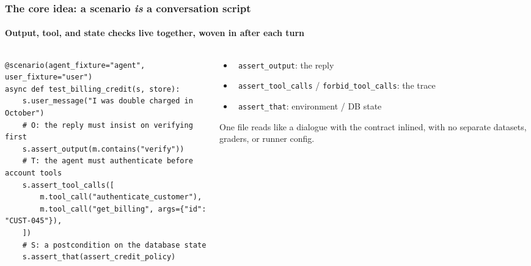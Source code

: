 \documentclass[
	aspectratio=169, %
	t,               %
	onlytextwidth,
	10pt,
]{beamer}
\newcommand{\chip}[2]{\tikz[baseline=(c.base)]{\node[fill=#1,text=white,rounded corners=2pt,
	font=\scriptsize\bfseries,inner sep=2.2pt] (c) {#2};}}
\newcommand{\Ochip}{\chip{ICLBlue}{\,O\,}}
\newcommand{\Tchip}{\chip{ICLBlue!70}{\,T\,}}
\newcommand{\Schip}{\chip{ICLDarkBlue}{\,S\,}}
\begin{document}
\begin{frame}[fragile]
	\frametitle{The core idea: a scenario \emph{is} a conversation script}
	\framesubtitle{Output, tool, and state checks live together, woven in after each turn}

	\begin{columns}[T]
		\begin{column}{0.62\linewidth}
\begin{lstlisting}
@scenario(agent_fixture="agent", user_fixture="user")
async def test_billing_credit(s, store):
    s.user_message("I was double charged in October")
    # O: the reply must insist on verifying first
    s.assert_output(m.contains("verify"))
    # T: the agent must authenticate before account tools
    s.assert_tool_calls([
        m.tool_call("authenticate_customer"),
        m.tool_call("get_billing", args={"id": "CUST-045"}),
    ])
    # S: a postcondition on the database state
    s.assert_that(assert_credit_policy)
\end{lstlisting}
		\end{column}
		\begin{column}{0.36\linewidth}
			\begin{itemize}
				\setlength\itemsep{0.5em}
				\item \Ochip\ \texttt{assert\_output}: the reply
				\item \Tchip\ \texttt{assert\_tool\_calls} / \texttt{forbid\_tool\_calls}: the trace
				\item \Schip\ \texttt{assert\_that}: environment / DB state
			\end{itemize}
			\vspace{0.4em}
			{\footnotesize One file reads like a dialogue with the contract inlined, with
			no separate datasets, graders, or runner config.}
		\end{column}
	\end{columns}
\end{frame}
\end{document}
